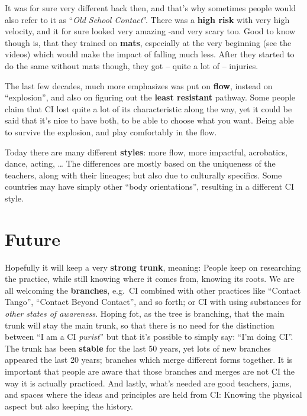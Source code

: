 It was for sure very different back then, and that's why sometimes people would also refer to it as ``\textit{Old School Contact}''.
There was a \textbf{high risk} with very high velocity, and it for sure looked very amazing -and very scary too.
Good to know though is, that they trained on \textbf{mats}, especially at the very beginning (see the videos) which would make the impact of falling much less.
After they started to do the same without mats though, they got -- quite a lot of -- injuries.

The last few decades, much more emphasizes was put on \textbf{flow}, instead on ``explosion'', and also on figuring out the \textbf{least resistant} pathway.
Some people claim that CI lost quite a lot of its characteristic along the way, yet it could be said that it's nice to have both, to be able to choose what you want.
Being able to survive the explosion, and play comfortably in the flow.

Today there are many different \textbf{styles}: more flow, more impactful, acrobatics, dance, acting, \ldots
The differences are mostly based on the uniqueness of the teachers, along with their lineages; but also due to culturally specifics.
Some countries may have simply other ``body orientations'', resulting in a different CI style.

\section{Future}\label{sec:future}

Hopefully it will keep a very \textbf{strong trunk}, meaning: People keep on researching the practice, while still knowing where it comes from, knowing its roots.
We are all welcoming the \textbf{branches}, e.g.\ CI combined with other practices like ``Contact Tango'', ``Contact Beyond Contact'', and so forth; or CI with using substances for \textit{other states of awareness}.
Hoping fot, as the tree is branching, that the main trunk will stay the main trunk, so that there is no need for the distinction between ``I am a CI \textit{purist}'' but that it's possible to simply say: ``I'm doing CI''.
The trunk has been \textbf{stable} for the last 50 years, yet lots of new branches appeared the last 20 years; branches which merge different forms together.
It is important that people are aware that those branches and merges are not CI the way it is actually practiced.
And lastly, what's needed are good teachers, jams, and spaces where the ideas and principles are held from CI: Knowing the physical aspect but also keeping the history.
